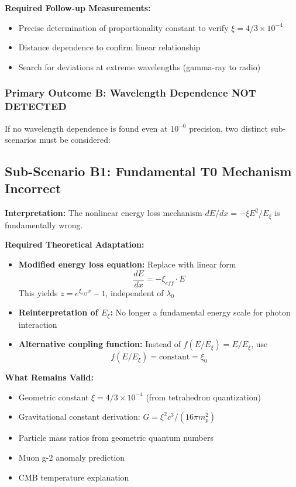 \documentclass[12pt,a4paper]{article}
\theoremstyle{definition}
\begin{document}
	\textbf{Required Follow-up Measurements:}
	\begin{itemize}
		\item Precise determination of proportionality constant to verify $\xi = 4/3 \times 10^{-4}$
		\item Distance dependence to confirm linear relationship
		\item Search for deviations at extreme wavelengths (gamma-ray to radio)
	\end{itemize}
	
	\subsubsection{Primary Outcome B: Wavelength Dependence NOT DETECTED}
	\label{subsubsec:not_detected}
	
	If no wavelength dependence is found even at $10^{-6}$ precision, two distinct sub-scenarios must be considered:
	
	\subsection{Sub-Scenario B1: Fundamental T0 Mechanism Incorrect}
	\label{subsec:scenario_b1}
	
	\textbf{Interpretation:} The nonlinear energy loss mechanism $dE/dx = -\xi E^2/E_\xi$ is fundamentally wrong.
	
	\textbf{Required Theoretical Adaptation:}
	\begin{itemize}
		\item \textbf{Modified energy loss equation:} Replace with linear form
		\begin{equation}
			\frac{dE}{dx} = -\xi_{eff} \cdot E
		\end{equation}
		This yields $z = e^{\xi_{eff} x} - 1$, independent of $\lambda_0$
		
		\item \textbf{Reinterpretation of $E_\xi$:} No longer a fundamental energy scale for photon interaction
		
		\item \textbf{Alternative coupling function:} Instead of $f(E/E_\xi) = E/E_\xi$, use
		\begin{equation}
			f(E/E_\xi) = \text{constant} = \xi_0
		\end{equation}
	\end{itemize}
	
	\textbf{What Remains Valid:}
	\begin{itemize}
		\item Geometric constant $\xi = 4/3 \times 10^{-4}$ (from tetrahedron quantization)
		\item Gravitational constant derivation: $G = \xi^2 c^3/(16\pi m_p^2)$
		\item Particle mass ratios from geometric quantum numbers
		\item Muon g-2 anomaly prediction
		\item CMB temperature explanation
	\end{itemize}
	
\end{document}
